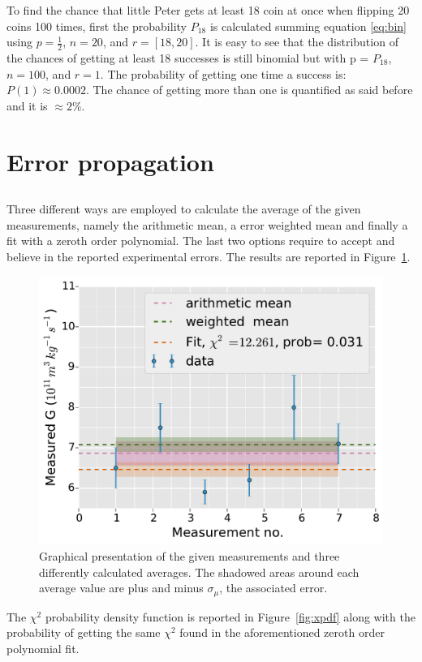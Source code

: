 \documentclass[twocolumn]{article}
\begin{document}
	To find the chance that little Peter gets at least 18 coin at once when flipping 20 coins 100 times, first the probability $P_{18}$ is calculated summing equation \ref{eq:bin} using $p= \frac{1}{2}$, $n=20$, and $r=[18,20]$.
	It is easy to see that the distribution of the chances of getting at least 18 successes is still binomial but with p = $P_{18}$, $n=100$, and $r=1$.
	The probability of getting one time a success is: $P(1) \approx 0.0002$. The chance of getting more than one is quantified as said before and it is  $\approx 2 \% $.
\clearpage
\section{Error propagation} %
\label{sec:error_propagation}
\subsection{} %
	Three different ways are employed to calculate the average of the given measurements, namely the arithmetic mean, a error weighted mean and finally a fit with a zeroth order polynomial.
	The last two options require to accept and believe in the reported experimental errors.
	The results are reported in Figure~\ref{fig:g}.

	\begin{figure}[h!]
		\begin{center}
			\includegraphics[width=.4\textwidth]{fig/g.pdf}
		\end{center}
		\caption{Graphical presentation of the given measurements and three differently calculated averages. The shadowed areas around each average value are plus and minus $\sigma_{\mu}$, the associated error.}
		\label{fig:g}
	\end{figure}

	The $\chi ^2 $ probability density function is reported in Figure~\ref{fig:xpdf} along with the probability of getting the same $\chi ^2 $ found in the aforementioned zeroth order polynomial fit.
\end{document}
